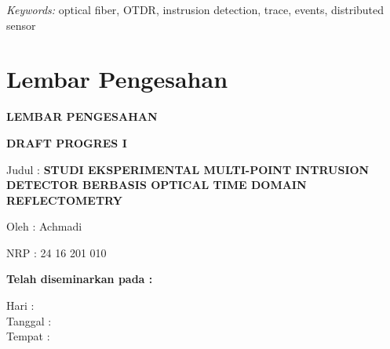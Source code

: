 \documentclass[12pt]{article}
\providecommand{\keyworden}[1]{\textit{Keywords: } #1}
\begin{document}
	\keyworden{optical fiber, OTDR, instrusion detection, trace, events, distributed sensor}
	
\newpage
\thispagestyle{plain}
\mbox{}

\newpage

	\section{Lembar Pengesahan}
	
	\begin{center}
		\textbf{LEMBAR PENGESAHAN}
	\end{center}
	
	\begin{center}
		\textbf{DRAFT PROGRES I}
	\end{center}

	\vspace{10pt}

	\begin{flushleft}
		Judul	: \textbf{STUDI EKSPERIMENTAL MULTI-POINT INTRUSION DETECTOR BERBASIS OPTICAL TIME DOMAIN REFLECTOMETRY}
	\end{flushleft}

	\begin{flushleft}
		Oleh : Achmadi
	\end{flushleft}

	\begin{flushleft}
		NRP : 24 16 201 010
	\end{flushleft}

	\vspace{20pt}
	
	\begin{center}
		\textbf{Telah diseminarkan pada :}
	\end{center}

	\vspace{10pt}

	\begin{flushleft}
		Hari \hspace{17pt}: \\
		Tanggal :\\
		Tempat \hspace{3pt}:  \\
	\end{flushleft}

	\vspace{20pt}
	
\end{document}
